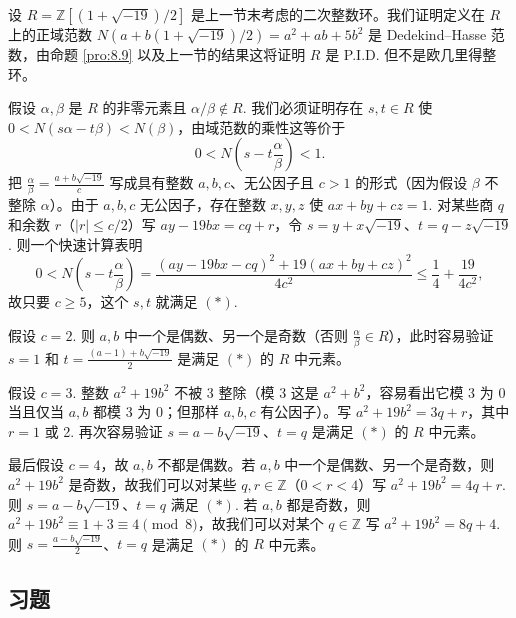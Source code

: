 \begin{example}
设 \(R = \mathbb{Z}[(1+\sqrt{-19})/2]\) 是上一节末考虑的二次整数环。我们证明定义在 \(R\) 上的正域范数 \(N(a + b(1+\sqrt{-19})/2) = a^2+ab+5b^2\) 是 Dedekind--Hasse 范数，由命题 \ref{pro:8.9} 以及上一节的结果这将证明 \(R\) 是 P.I.D. 但不是欧几里得整环。

假设 \(\alpha, \beta\) 是 \(R\) 的非零元素且 \(\alpha/\beta \notin R\). 我们必须证明存在 \(s, t \in R\) 使 \(0 < N(s\alpha - t\beta) < N(\beta)\)，由域范数的乘性这等价于
\[
0 < N\left(s - t\frac{\alpha}{\beta}\right) < 1. \tag{$*$}
\]
把 \(\frac{\alpha}{\beta} = \frac{a+b\sqrt{-19}}{c}\) 写成具有整数 \(a, b, c\)、无公因子且 \(c > 1\) 的形式（因为假设 \(\beta\) 不整除 \(\alpha\)）。由于 \(a, b, c\) 无公因子，存在整数 \(x, y, z\) 使 \(ax+by+cz = 1\). 对某些商 \(q\) 和余数 \(r\)（\(|r| \leq c/2\)）写 \(ay - 19bx = cq + r\)，令 \(s = y + x\sqrt{-19}\)、\(t = q - z\sqrt{-19}\). 则一个快速计算表明
\[
0 < N\left(s - t\frac{\alpha}{\beta}\right) = \frac{(ay-19bx-cq)^2 + 19(ax+by+cz)^2}{4c^2} \leq \frac{1}{4} + \frac{19}{4c^2},
\]
故只要 \(c \geq 5\)，这个 \(s, t\) 就满足 \((*)\).

假设 \(c = 2\). 则 \(a, b\) 中一个是偶数、另一个是奇数（否则 \(\frac{\alpha}{\beta} \in R\)），此时容易验证 \(s = 1\) 和 \(t = \frac{(a-1)+b\sqrt{-19}}{2}\) 是满足 \((*)\) 的 \(R\) 中元素。

假设 \(c = 3\). 整数 \(a^2+19b^2\) 不被 3 整除（模 3 这是 \(a^2+b^2\)，容易看出它模 3 为 0 当且仅当 \(a, b\) 都模 3 为 0；但那样 \(a, b, c\) 有公因子）。写 \(a^2+19b^2 = 3q + r\)，其中 \(r = 1\) 或 2. 再次容易验证 \(s = a - b\sqrt{-19}\)、\(t = q\) 是满足 \((*)\) 的 \(R\) 中元素。

最后假设 \(c = 4\)，故 \(a, b\) 不都是偶数。若 \(a, b\) 中一个是偶数、另一个是奇数，则 \(a^2+19b^2\) 是奇数，故我们可以对某些 \(q, r \in \mathbb{Z}\)（\(0 < r < 4\)）写 \(a^2+19b^2 = 4q+r\). 则 \(s = a-b\sqrt{-19}\)、\(t = q\) 满足 \((*)\). 若 \(a, b\) 都是奇数，则 \(a^2+19b^2 \equiv 1+3 \equiv 4 \pmod 8\)，故我们可以对某个 \(q \in \mathbb{Z}\) 写 \(a^2+19b^2 = 8q+4\). 则 \(s = \frac{a-b\sqrt{-19}}{2}\)、\(t = q\) 是满足 \((*)\) 的 \(R\) 中元素。
\end{example}

\subsection*{习题}

